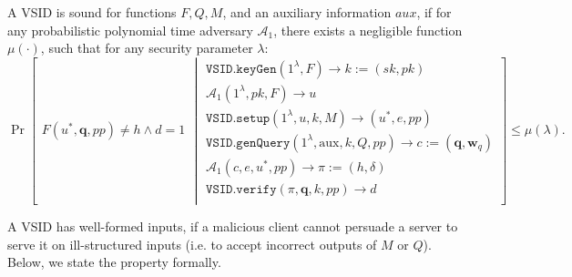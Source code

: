 \begin{definition}\label{deff::VSID-Soundness}  A VSID  is sound for functions $F,Q,M$, and an auxiliary information $aux$, if for any probabilistic polynomial time adversary $\mathcal{A}_{\scriptscriptstyle 1}$, there exists a negligible function $\mu(\cdot)$, such that for any security parameter $\lambda$: 
\small{
$$ \Pr\left[
  \begin{array}{l}
F(u^{\scriptscriptstyle *}, \bm{q},{pp})\neq h \wedge d=1
\end{array} \middle |
    \begin{array}{l}
    \mathtt{VSID.keyGen}(1^{\lambda},F)\rightarrow k:=(sk,pk)\\
    \mathcal{A}_{\scriptscriptstyle 1}(1^{\scriptscriptstyle\lambda},pk, F)\rightarrow u\\
    \mathtt{VSID.setup}(1^{\lambda}, u, k, M)\rightarrow (u^{\scriptscriptstyle *},e,{pp})\\
    \mathtt{VSID.genQuery}(1^{\lambda},  \text{aux},k,Q,{pp})\rightarrow c:=(\bm{q}, \bm{w}_{q})\\
     \mathcal{A}_{\scriptscriptstyle 1}(c,e, u^{\scriptscriptstyle *},{pp})\rightarrow \pi:=(h,\delta)\\
     \mathtt{VSID.verify}(\pi,\bm{q},k,{pp})\rightarrow d\\
\end{array}    \right]\leq \mu(\lambda).$$
}
\end{definition}


A VSID has   well-formed inputs, if a malicious client cannot persuade a server to serve it on  ill-structured inputs (i.e. to accept  incorrect outputs of $M$ or $Q$). Below, we state the property formally.

